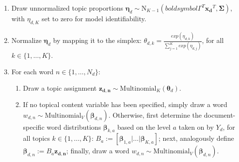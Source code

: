 \begin{enumerate}[{1)}]
\vspace{-0.25cm}
\item Draw unnormalized topic proportions $\boldsymbol{\eta}_d \sim \text{N}_{K-1}(boldsymbol{\Gamma}^T\boldsymbol{x_d}^T, \boldsymbol{\Sigma})$, with $\eta_{d,K}$ set to zero for model identifiability.
\vspace{-0.25cm}
\item Normalize $\boldsymbol{\eta}_d$ by mapping it to the simplex: $\theta_{d,k} = \frac{exp(\eta_{d,k})}{\sum_{j=1}^{K}exp(\eta_{d,j})}$, for all $k \in \{1,\dots,K\}$.
\vspace{-0.25cm}
\item For each word $n \in \{1,\dots,N_d\}$:
	\begin{enumerate}[{a)}]
	\vspace{-0.25cm}    
    \item Draw a topic assignment $\boldsymbol{z_{d,n}} \sim \text{Multinomial}_K(\boldsymbol{\theta}_d)$.
	\vspace{-0.25cm}    
    \item If no topical content variable has been specified, simply draw a word $w_{d,n} \sim \text{Multinomial}_V(\boldsymbol{\beta}_{d,n})$. Otherwise, first determine the document-specific word distributions $\boldsymbol{\beta}_{k,a}$ based on the level $a$ taken on by $Y_d$, for all topics $k \in \{1,\dots,K\}$: $B_a := [\boldsymbol{\beta}_{1,a}|\dots|\boldsymbol{\beta}_{K,a}]$; next, analogously define $\boldsymbol{\beta}_{d,n}:=B_a\boldsymbol{z_{d,n}}$; finally, draw a word $w_{d,n} \sim \text{Multinomial}_V(\boldsymbol{\beta}_{d,n})$.
	\end{enumerate}
\end{enumerate}

